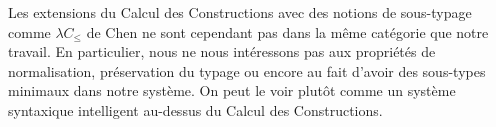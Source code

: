 Les extensions du Calcul des Constructions avec des notions de
sous-typage comme $\lambda C_\leq$ de Chen ne sont cependant pas
dans la m\^eme cat\'egorie que notre travail. En particulier, nous ne
nous int\'eressons pas aux propri\'et\'es de normalisation, pr\'eservation du
typage ou encore au fait d'avoir des sous-types minimaux dans notre
syst\`eme. On peut le voir plut\^ot comme un syst\`eme syntaxique intelligent
au-dessus du Calcul des Constructions.

